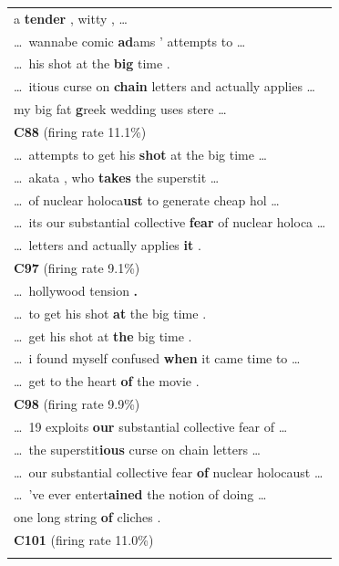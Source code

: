 \begin{longtable}{@{}>{\ttfamily}p{\linewidth}@{}}
    \cmidrule(){1-1}
    a\textbf{ tender} , witty , \dots\\
    \dots\ wannabe comic\textbf{ ad}ams ' attempts to \dots\\
    \dots\ his shot at the\textbf{ big} time .\\
    \dots\ itious curse on\textbf{ chain} letters and actually applies \dots\\
    my big fat\textbf{ g}reek wedding uses stere \dots\\
    \addlinespace
    {\normalfont\textbf{C88} \hfill (firing rate 11.1\%)}\\
    \cmidrule(){1-1}
    \dots\ attempts to get his\textbf{ shot} at the big time \dots\\
    \dots\ akata , who\textbf{ takes} the superstit \dots\\
    \dots\ of nuclear holoca\textbf{ust} to generate cheap hol \dots\\
    \dots\ its our substantial collective\textbf{ fear} of nuclear holoca \dots\\
    \dots\ letters and actually applies\textbf{ it} .\\
    \addlinespace
    {\normalfont\textbf{C97} \hfill (firing rate 9.1\%)}\\
    \cmidrule(){1-1}
    \dots\ hollywood tension\textbf{ .} \\
    \dots\ to get his shot\textbf{ at} the big time .\\
    \dots\ get his shot at\textbf{ the} big time .\\
    \dots\ i found myself confused\textbf{ when} it came time to \dots\\
    \dots\ get to the heart\textbf{ of} the movie .\\
    \addlinespace
    {\normalfont\textbf{C98} \hfill (firing rate 9.9\%)}\\
    \cmidrule(){1-1}
    \dots\ 19 exploits\textbf{ our} substantial collective fear of \dots\\
    \dots\ the superstit\textbf{ious} curse on chain letters \dots\\
    \dots\ our substantial collective fear\textbf{ of} nuclear holocaust \dots\\
    \dots\ 've ever entert\textbf{ained} the notion of doing \dots\\
    one long string\textbf{ of} cliches .\\
    \addlinespace
    {\normalfont\textbf{C101} \hfill (firing rate 11.0\%)}\\
    \cmidrule(){1-1}

\end{longtable}

